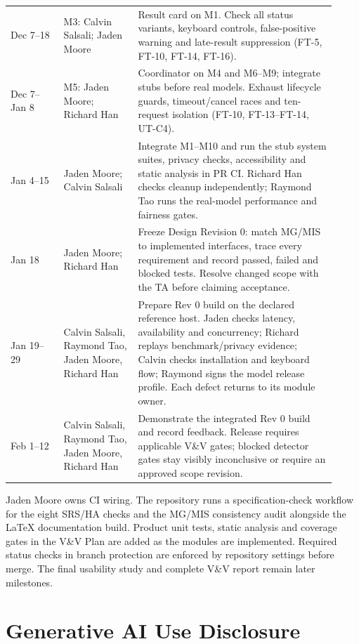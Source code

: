\documentclass[12pt, titlepage]{article}
\begin{document}
\begin{longtable}{@{}p{0.15\linewidth}p{0.21\linewidth}p{0.56\linewidth}@{}}
Dec 7--18 & M3: Calvin Salsali; Jaden Moore & Result card on M1. Check all status variants, keyboard controls, false-positive warning and late-result suppression (FT-5, FT-10, FT-14, FT-16). \\
Dec 7--Jan 8 & M5: Jaden Moore; Richard Han & Coordinator on M4 and M6--M9; integrate stubs before real models. Exhaust lifecycle guards, timeout/cancel races and ten-request isolation (FT-10, FT-13--FT-14, UT-C4). \\
Jan 4--15 & Jaden Moore; Calvin Salsali & Integrate M1--M10 and run the stub system suites, privacy checks, accessibility and static analysis in PR CI. Richard Han checks cleanup independently; Raymond Tao runs the real-model performance and fairness gates. \\
Jan 18 & Jaden Moore; Richard Han & Freeze Design Revision 0: match MG/MIS to implemented interfaces, trace every requirement and record passed, failed and blocked tests. Resolve changed scope with the TA before claiming acceptance. \\
Jan 19--29 & Calvin Salsali, Raymond Tao, Jaden Moore, Richard Han & Prepare Rev 0 build on the declared reference host. Jaden checks latency, availability and concurrency; Richard replays benchmark/privacy evidence; Calvin checks installation and keyboard flow; Raymond signs the model release profile. Each defect returns to its module owner. \\
Feb 1--12 & Calvin Salsali, Raymond Tao, Jaden Moore, Richard Han & Demonstrate the integrated Rev 0 build and record feedback. Release requires applicable V\&V gates; blocked detector gates stay visibly inconclusive or require an approved scope revision. \\
\bottomrule
\end{longtable}

Jaden Moore owns CI wiring. The repository runs a specification-check workflow for the eight SRS/HA checks and the MG/MIS consistency audit alongside the LaTeX documentation build. Product unit tests, static analysis and coverage gates in the V\&V Plan are added as the modules are implemented. Required status checks in branch protection are enforced by repository settings before merge. The final usability study and complete V\&V report remain later milestones.

\clearpage

\section{Generative AI Use Disclosure}
\end{document}
